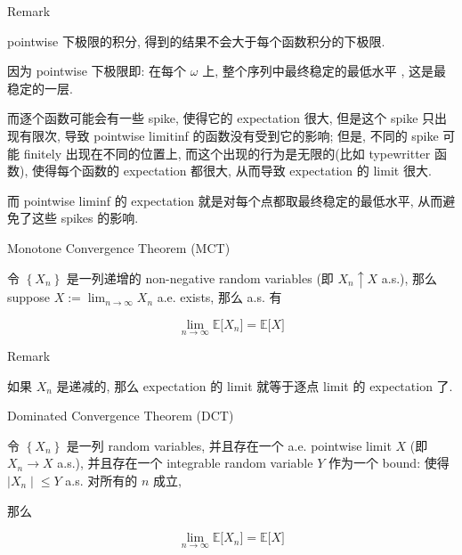 \documentclass{qlnotes-export}
\begin{document}
\begin{qlremark}{Remark}

pointwise 下极限的积分, 得到的结果不会大于每个函数积分的下极限.

因为 pointwise 下极限即: 在每个 \(\omega\) 上, 整个序列中最终稳定的最低水平 , 这是最稳定的一层.

而逐个函数可能会有一些 spike, 使得它的 expectation 很大, 但是这个 spike 只出现有限次, 导致 pointwise limitinf 的函数没有受到它的影响; 但是, 不同的 spike 可能 finitely 出现在不同的位置上, 而这个出现的行为是无限的(比如 typewritter 函数), 使得每个函数的 expectation 都很大, 从而导致 expectation 的 limit 很大.

而 pointwise liminf 的 expectation 就是对每个点都取最终稳定的最低水平, 从而避免了这些 spikes 的影响.

\end{qlremark}

\begin{theorem}{Monotone Convergence Theorem (MCT)}\label{thm-04-lln-monotone-convergence-theorem-mct}

令 \(\left\{ X_{n} \right\}\) 是一列递增的 non-negative random variables (即 \(X_{n} \uparrow X\) a.s.), 那么 suppose \(X := \lim_{n\rightarrow\infty}X_{n}\) a.e. exists, 那么 a.s. 有

\[\lim\limits_{n\rightarrow\infty}{\mathbb{E}}\lbrack X_{n}\rbrack = {\mathbb{E}}\lbrack X\rbrack\]

\end{theorem}

\begin{qlremark}{Remark}

如果 \(X_{n}\) 是递减的, 那么 expectation 的 limit 就等于逐点 limit 的 expectation 了.

\end{qlremark}

\begin{theorem}{Dominated Convergence Theorem (DCT)}\label{thm-04-lln-dominated-convergence-theorem-dct}

令 \(\left\{ X_{n} \right\}\) 是一列 random variables, 并且存在一个 a.e. pointwise limit \(X\) (即 \(X_{n}\rightarrow X\) a.s.), 并且存在一个 integrable random variable \(Y\) 作为一个 bound: 使得 \(\left. |X_{n} \middle| \leq Y \right.\) a.s. 对所有的 \(n\) 成立,

那么

\[\lim\limits_{n\rightarrow\infty}{\mathbb{E}}\lbrack X_{n}\rbrack = {\mathbb{E}}\lbrack X\rbrack\]

\end{theorem}
\end{document}
